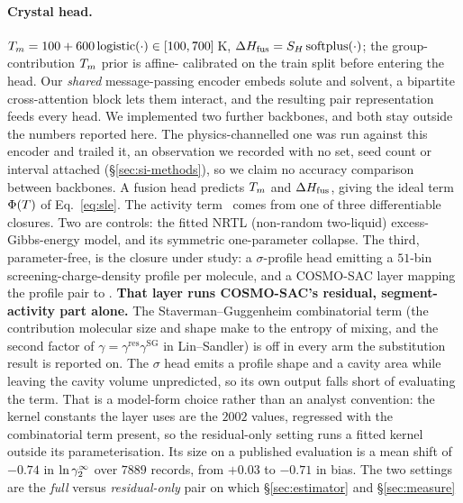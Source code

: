 \paragraph{Crystal head.} $T_m=100+600\,\mathrm{logistic}(\cdot)\in[100,700]$\,K,
$\Delta H_{\mathrm{fus}}=S_H\,\mathrm{softplus}(\cdot)$; the group-contribution $T_m$ prior is affine-
calibrated on the train split before entering the head.
Our \emph{shared} message-passing encoder embeds solute and solvent, a bipartite cross-attention block
lets them interact, and the resulting pair representation feeds every head. We implemented two
further backbones, and both stay outside the numbers reported here. The physics-channelled one was run
against this encoder and trailed it, an observation we recorded with no set, seed count or
interval attached (\S\ref{sec:si-methods}), so we claim no accuracy comparison between
backbones. A fusion head predicts $T_m$ and $\Delta H_{\mathrm{fus}}$, giving the
ideal term $\Phi(T)$ of Eq.~\eqref{eq:sle}. The activity term \lng\ comes from one of three
differentiable closures. Two are controls: the fitted NRTL (non-random two-liquid) excess-Gibbs-energy model, and its
symmetric one-parameter collapse. The third, parameter-free, is the closure under study: a $\sigma$-profile head emitting a
$51$-bin screening-charge-density profile per molecule, and a COSMO-SAC layer mapping the profile
pair to \lng. \textbf{That layer runs COSMO-SAC's residual, segment-activity part alone.} The
Staverman--Guggenheim combinatorial term (the contribution molecular size and shape make to the
entropy of mixing, and the second factor of $\gamma=\gamma^{\mathrm{res}}\gamma^{\mathrm{SG}}$ in
Lin--Sandler) is off in every arm the substitution result is reported on. The $\sigma$ head
emits a profile shape and a cavity area while leaving the cavity volume unpredicted, so its own
output falls short of evaluating the term. That is a model-form choice rather than an analyst convention: the kernel
constants the layer uses are the $2002$ values, regressed with the combinatorial term present, so
the residual-only setting runs a fitted kernel outside its parameterisation. Its size on a published
evaluation is a mean shift of $-0.74$ in $\ln\gamma_2^\infty$ over $7889$ records, from $+0.03$ to $-0.71$ in
bias. The two settings are the \emph{full} versus \emph{residual-only} pair on which
\S\ref{sec:estimator} and \S\ref{sec:measure}
